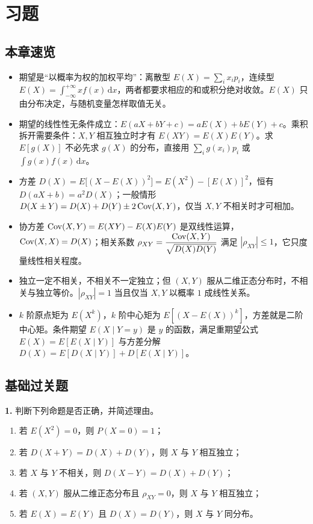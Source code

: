\section{习题}

\providecommand{\chapfourans}[1]{%
  \par\noindent\fbox{\parbox{\dimexpr\linewidth-2\fboxsep-2\fboxrule\relax}{\textbf{答案：}#1}}\par}

\subsection{本章速览}
\begin{itemize}
    \item 期望是“以概率为权的加权平均”：离散型 $E(X)=\sum_i x_ip_i$，连续型 $E(X)=\int_{-\infty}^{+\infty}xf(x)\,\mathrm{d}x$，两者都要求相应的和或积分绝对收敛。$E(X)$ 只由分布决定，与随机变量怎样取值无关。
    \item 期望的线性性无条件成立：$E(aX+bY+c)=aE(X)+bE(Y)+c$。乘积拆开需要条件：$X,Y$ 相互独立时才有 $E(XY)=E(X)E(Y)$。求 $E[g(X)]$ 不必先求 $g(X)$ 的分布，直接用 $\sum_i g(x_i)p_i$ 或 $\int g(x)f(x)\,\mathrm{d}x$。
    \item 方差 $D(X)=E\bigl[(X-E(X))^2\bigr]=E(X^2)-[E(X)]^2$，恒有 $D(aX+b)=a^2D(X)$；一般情形 $D(X\pm Y)=D(X)+D(Y)\pm2\operatorname{Cov}(X,Y)$，仅当 $X,Y$ 不相关时才可相加。
    \item 协方差 $\operatorname{Cov}(X,Y)=E(XY)-E(X)E(Y)$ 是双线性运算，$\operatorname{Cov}(X,X)=D(X)$；相关系数 $\rho_{XY}=\dfrac{\operatorname{Cov}(X,Y)}{\sqrt{D(X)D(Y)}}$ 满足 $|\rho_{XY}|\le1$，它只度量线性相关程度。
    \item 独立一定不相关，不相关不一定独立；但 $(X,Y)$ 服从二维正态分布时，不相关与独立等价。$|\rho_{XY}|=1$ 当且仅当 $X,Y$ 以概率 $1$ 成线性关系。
    \item $k$ 阶原点矩为 $E(X^k)$，$k$ 阶中心矩为 $E[(X-E(X))^k]$，方差就是二阶中心矩。条件期望 $E(X\mid Y=y)$ 是 $y$ 的函数，满足重期望公式 $E(X)=E[E(X\mid Y)]$ 与方差分解 $D(X)=E[D(X\mid Y)]+D[E(X\mid Y)]$。
\end{itemize}

\subsection{基础过关题}

\textbf{1.} 判断下列命题是否正确，并简述理由。
\begin{enumerate}[label=(\arabic*)]
    \item 若 $E(X^2)=0$，则 $P(X=0)=1$；
    \item 若 $D(X+Y)=D(X)+D(Y)$，则 $X$ 与 $Y$ 相互独立；
    \item 若 $X$ 与 $Y$ 不相关，则 $D(X-Y)=D(X)+D(Y)$；
    \item 若 $(X,Y)$ 服从二维正态分布且 $\rho_{XY}=0$，则 $X$ 与 $Y$ 相互独立；
    \item 若 $E(X)=E(Y)$ 且 $D(X)=D(Y)$，则 $X$ 与 $Y$ 同分布。
\end{enumerate}

